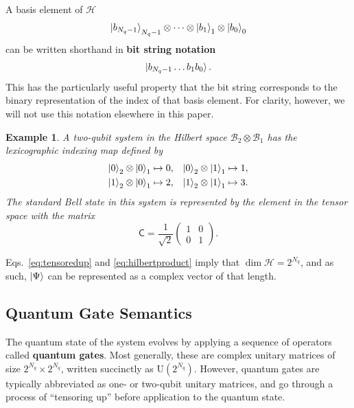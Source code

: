 \documentclass[conference]{IEEEtran}
\newcommand{\defn}[1]{\textbf{#1}}
\newcommand{\Hil}{\ensuremath{\mathscr{H}}}
\newcommand{\BHil}{\ensuremath{\mathscr{B}}}
\newtheorem{example}{Example}
\begin{document}
A basis element of $\Hil$ \[\ket{b_{N_q-1}}_{N_q-1}\otimes\cdots\otimes\ket{b_1}_1\otimes\ket{b_0}_0\] can be written shorthand in \defn{bit string notation} \[\ket{b_{N_q-1}\ldots b_1 b_0}.\] This has the particularly useful property that the bit string corresponds to the binary representation of the index of that basis element. For clarity, however, we will not use this notation elsewhere in this paper.

\begin{example}
A two-qubit system in the Hilbert space $\BHil_2\otimes \BHil_1$ has the lexicographic indexing map defined by
\begin{align*}
\ket{0}_2\otimes\ket{0}_1 &\mapsto 0, &
\ket{0}_2\otimes\ket{1}_1 &\mapsto 1,\\
\ket{1}_2\otimes\ket{0}_1 &\mapsto 2, &
\ket{1}_2\otimes\ket{1}_1 &\mapsto 3.
\end{align*}
The standard Bell state in this system is represented by the element in the tensor space with the matrix
\begin{equation*}
\mathsf{C} = \frac{1}{\sqrt{2}}
\begin{pmatrix}
1 & 0 \\ 
0 & 1
\end{pmatrix}.
\end{equation*}
\end{example}

Eqs.~\eqref{eq:tensoredup} and \eqref{eq:hilbertproduct} imply that $\dim \Hil = 2^{N_q}$, and as such, $\ket{\Psi}$ can be represented as a complex vector of that length.

\subsection{Quantum Gate Semantics}\label{sec:gatesemantics}
The quantum state of the system evolves by applying a sequence of operators called \defn{quantum gates}. Most generally, these are complex unitary matrices of size $2^{N_q} \times 2^{N_q}$, written succinctly as $\mathrm{U}(2^{N_q})$. However, quantum gates are typically abbreviated as one- or two-qubit unitary matrices, and go through a process of ``tensoring up'' before application to the quantum state. 
\end{document}
